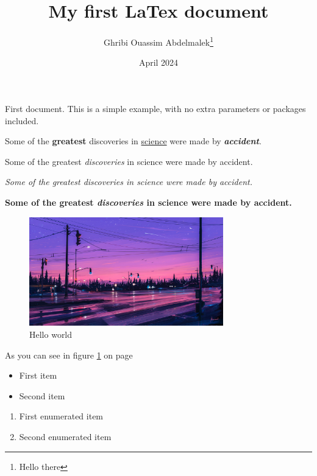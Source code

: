 \documentclass[12pt, a4paper]{article}
\title{My first LaTex document}
\author{Ghribi Ouassim Abdelmalek\thanks{Hello there}}
\date{April 2024}
\begin{document}
\maketitle
First document. This is a simple example, with no
extra parameters or packages included.

Some of the \textbf{greatest}
discoveries in \underline{science}
were made by \textbf{\textit{accident}}.

Some of the greatest \emph{discoveries} in science
were made by accident.

\textit{Some of the greatest \emph{discoveries}
    in science were made by accident.}

\textbf{Some of the greatest \emph{discoveries}
    in science were made by accident.}


\begin{figure}[h]
    \centering
    \includegraphics[width=0.75\textwidth]{alena-aenami-7p-m}
    \caption{Hello world}
    \label{fig:test-1}
\end{figure}

As you can see in figure \ref{fig:test-1} on page \pageref{fig:test-1}

\begin{itemize}
    \item First item
    \item Second item
\end{itemize}

\begin{enumerate}
    \item First enumerated item
    \item Second enumerated item
\end{enumerate}
\end{document}
